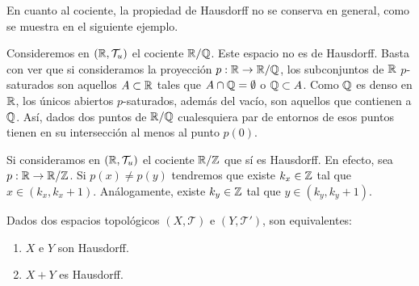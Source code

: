En cuanto al cociente, la propiedad de Hausdorff no se conserva en general, como se muestra en el siguiente ejemplo.
\begin{eg}
Consideremos en $\displaystyle \left(\mathbb{R}, \mathcal{T}_{u}\right) $ el cociente $\displaystyle \mathbb{R} / \mathbb{Q} $. Este espacio no es de Hausdorff. Basta con ver que si consideramos la proyección $\displaystyle p : \mathbb{R} \to \mathbb{R} / \mathbb{Q} $, los subconjuntos de $\displaystyle \mathbb{R} $ $\displaystyle p $-saturados son aquellos $\displaystyle A \subset \mathbb{R} $ tales que $\displaystyle A \cap \mathbb{Q} = \emptyset $ o $\displaystyle \mathbb{Q} \subset A $. 
Como $\displaystyle \mathbb{Q} $ es denso en $\displaystyle \mathbb{R} $, los únicos abiertos $\displaystyle p $-saturados, además del vacío, son aquellos que contienen a $\displaystyle \mathbb{Q} $. Así, dados dos puntos de $\displaystyle \mathbb{R}/\mathbb{Q} $ cualesquiera par de entornos de esos puntos tienen en su intersección al menos al punto $\displaystyle p\left(0\right) $. 
\end{eg}
\begin{eg}
Si consideramos en $\displaystyle \left(\mathbb{R}, \mathcal{T}_{u}\right) $ el cociente $\displaystyle \mathbb{R} / \mathbb{Z} $ que sí es Hausdorff. En efecto, sea $\displaystyle p : \mathbb{R} \to \mathbb{R}/ \mathbb{Z} $. Si $\displaystyle p\left(x\right)\neq p\left(y\right) $ tendremos que existe $\displaystyle k_{x} \in \mathbb{Z} $ tal que $\displaystyle x \in \left(k_{x}, k_{x}+1\right) $. 
Análogamente, existe $\displaystyle k_{y} \in \mathbb{Z} $ tal que $\displaystyle y \in \left(k_{y}, k_{y}+1\right) $. 
\end{eg}
\begin{prop}
Dados dos espacios topológicos $\displaystyle \left(X, \mathcal{T}\right) $ e $\displaystyle \left(Y, \mathcal{T}'\right) $, son equivalentes:
\begin{enumerate}
\item $\displaystyle X $ e $\displaystyle Y $ son Hausdorff. 
\item $\displaystyle X + Y $ es Hausdorff. 
\end{enumerate}
\end{prop}
